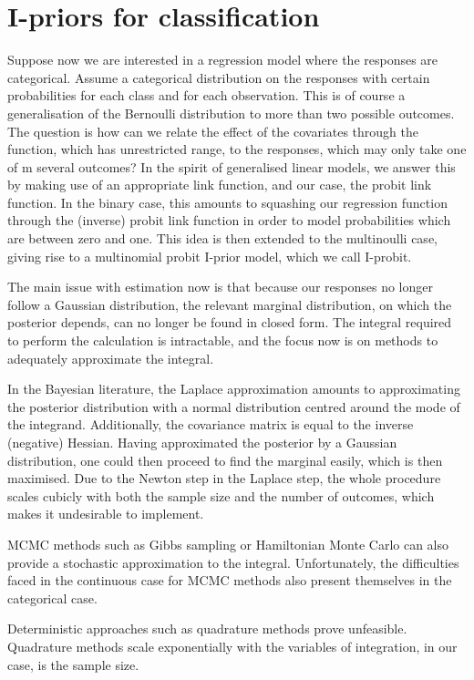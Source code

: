 \section{I-priors for classification}

Suppose now we are interested in a regression model where the responses are categorical. Assume a categorical distribution on the responses with certain probabilities for each class and for each observation. This is of course a generalisation of the Bernoulli distribution to more than two possible outcomes. The question is how can we relate the effect of the covariates through the function, which has unrestricted range, to the responses, which may only take one of m several outcomes? In the spirit of generalised linear models, we answer this by making use of an appropriate link function, and our case, the probit link function. In the binary case, this amounts to squashing our regression function through the (inverse) probit link function in order to model probabilities which are between zero and one. This idea is then extended to the multinoulli case, giving rise to a multinomial probit I-prior model, which we call I-probit.

The main issue with estimation now is that because our responses no longer follow a Gaussian distribution, the relevant marginal distribution, on which the posterior depends, can no longer be found in closed form. The integral required to perform the calculation is intractable, and the focus now is on methods to adequately approximate the integral.

In the Bayesian literature, the Laplace approximation amounts to approximating the posterior distribution with a normal distribution centred around the mode of the integrand. Additionally, the covariance matrix is equal to the inverse (negative) Hessian. Having approximated the posterior by a Gaussian distribution, one could then proceed to find the marginal easily, which is then maximised. Due to the Newton step in the Laplace step, the whole procedure scales cubicly with both the sample size and the number of outcomes, which makes it undesirable to implement.

MCMC methods such as Gibbs sampling or Hamiltonian Monte Carlo can also provide a stochastic approximation to the integral. Unfortunately, the difficulties faced in the continuous case for MCMC methods also present themselves in the categorical case.

Deterministic approaches such as quadrature methods prove unfeasible. Quadrature methods scale exponentially with the variables of integration, in our case, is the sample size.

